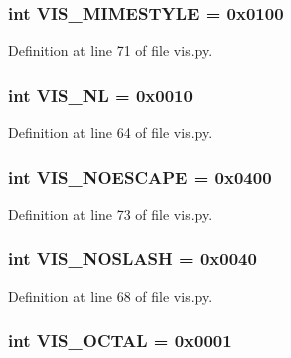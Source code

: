 \subsubsection[{V\+I\+S\+\_\+\+M\+I\+M\+E\+S\+T\+Y\+L\+E}]{\setlength{\rightskip}{0pt plus 5cm}int V\+I\+S\+\_\+\+M\+I\+M\+E\+S\+T\+Y\+L\+E = 0x0100}\label{namespacevis_ab20b44c1bf3cf48848b33d27d83af817}


Definition at line 71 of file vis.\+py.

\subsubsection[{V\+I\+S\+\_\+\+N\+L}]{\setlength{\rightskip}{0pt plus 5cm}int V\+I\+S\+\_\+\+N\+L = 0x0010}\label{namespacevis_ae1d7e50962721a6d4f82225d1143108f}


Definition at line 64 of file vis.\+py.

\subsubsection[{V\+I\+S\+\_\+\+N\+O\+E\+S\+C\+A\+P\+E}]{\setlength{\rightskip}{0pt plus 5cm}int V\+I\+S\+\_\+\+N\+O\+E\+S\+C\+A\+P\+E = 0x0400}\label{namespacevis_aacc1c87eb43ad1dc36f64e8ae41847e6}


Definition at line 73 of file vis.\+py.

\subsubsection[{V\+I\+S\+\_\+\+N\+O\+S\+L\+A\+S\+H}]{\setlength{\rightskip}{0pt plus 5cm}int V\+I\+S\+\_\+\+N\+O\+S\+L\+A\+S\+H = 0x0040}\label{namespacevis_a2cf362f3a1fa24a7fd03ec6e18d2d1ae}


Definition at line 68 of file vis.\+py.

\subsubsection[{V\+I\+S\+\_\+\+O\+C\+T\+A\+L}]{\setlength{\rightskip}{0pt plus 5cm}int V\+I\+S\+\_\+\+O\+C\+T\+A\+L = 0x0001}\label{namespacevis_a00500464ce3dde130f6e58262e7f9122}


